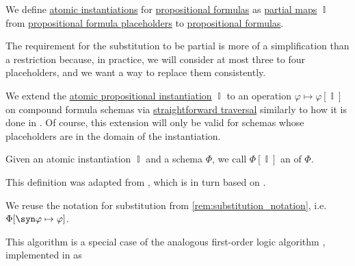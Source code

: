 \begin{definition}\label{def:atomic_propositional_instantiation}\mimprovised
  We define \hyperref[con:schemas_and_instances]{atomic instantiations} for \hyperref[def:propositional_formula]{propositional formulas} as \hyperref[def:partial_function]{partial maps} \( \BbbI \) from \hyperref[def:propositional_formula_schema]{propositional formula placeholders} to \hyperref[def:propositional_formula]{propositional formulas}.
\end{definition}
\begin{comments}
  \item The requirement for the substitution to be partial is more of a simplification than a restriction because, in practice, we will consider at most three to four placeholders, and we want a way to replace them consistently.
\end{comments}

\begin{algorithm}\label{alg:propositional_schema_instantiation}\mimprovised
  We extend the \hyperref[def:atomic_propositional_instantiation]{atomic propositional instantiation} \( \BbbI \) to an operation \( \varphi \mapsto \varphi[\BbbI] \) on compound formula schemas via \hyperref[rem:straightforward_traversal]{straightforward traversal} similarly to how it is done in . Of course, this extension will only be valid for schemas whose placeholders are in the domain of the instantiation.

  Given an atomic instantiation \( \BbbI \) and a schema \( \Phi \), we call \( \Phi[\BbbI] \) an  of \( \Phi \).
\end{algorithm}
\begin{comments}
  \item This definition was adapted from , which is in turn based on \cite[def. 3.1.3]{CitkinMuravitsky2022ConsequenceRelations}.

  \item We reuse the notation for substitution from \cref{rem:substitution_notation}, i.e. \( \Phi[\syn\varphi \mapsto \varphi] \).

  \item This algorithm is a special case of the analogous first-order logic algorithm , implemented in \cite{notebook:code} as
  \begin{CodeRefDisplay}
  \end{CodeRefDisplay}
\end{comments}

